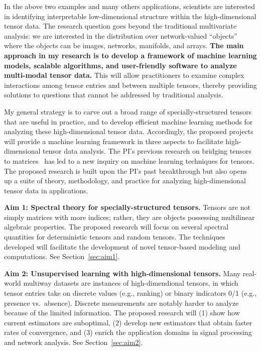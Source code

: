 \documentclass[10pt]{article}
\theoremstyle{definition}
\theoremstyle{definition}
\theoremstyle{definition}
\begin{document}
\begin{enumerate}
In the above two examples and many others applications, scientists are interested in identifying interpretable low-dimensional structure within the high-dimensional tensor data. The research question goes beyond the traditional multivariate analysis: we are interested in the distribution over network-valued ``objects'' where the objects can be images, networks, manifolds, and arrays. {\bf The main approach in my research is to develop a framework of machine learning models, scalable algorithms, and user-friendly software to analyze multi-modal tensor data.} This will allow practitioners to examine complex interactions among tensor entries and between multiple tensors, thereby providing solutions to questions that cannot be addressed by traditional analysis.  

My general strategy is to carve out a broad range of specially-structured tensors that are useful in practice, and to develop efficient machine learning methods for analyzing these high-dimensional tensor data. Accordingly, the proposed projects will provide a machine learning framework in three aspects to facilitate high-dimensional tensor data analysis. The PI’s previous research on bridging tensors to matrices~\cite{wang2017operator,zeng2019multiway,wang2018learning,wang2017tensor,wang2019three,lee2020tensor} has led to a new inquiry on machine learning techniques for tensors. The proposed research is built upon the PI's past breakthrough but also opens up a suite of theory, methodology, and practice for analyzing high-dimensional tensor data in applications. 

{\bf Aim 1: Spectral theory for specially-structured tensors.} Tensors are not simply matrices with more indices; rather, they are objects possessing multilinear algebraic properties. The proposed research will focus on several spectral quantities for deterministic tensors and random tensors. The techniques developed will facilitate the development of novel tensor-based modeling and computations. See Section~\ref{sec:aim1}.

{\bf Aim 2: Unsupervised learning with high-dimensional tensors.} Many real-world multiway datasets are instances of high-dimendional tensors, in which tensor entries take on discrete values (e.g., ranking) or binary indicators 0/1 (e.g., presence vs.\ absence). Discrete measurements are notably harder to analyze because of the limited information. The proposed research will (1) show how current estimators are suboptimal, (2) develop new estimators that obtain faster rates of convergence, and (3) enrich the application domains in signal processing and network analysis. See Section~\ref{sec:aim2}.


\end{enumerate}
\end{document}
